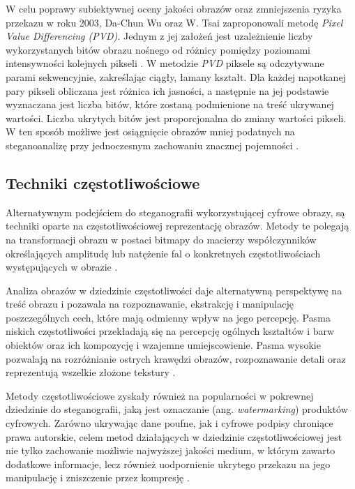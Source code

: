 {{{            %
            W celu poprawy subiektywnej oceny jakości obrazów oraz zmniejszenia ryzyka przekazu w roku 2003, Da-Chun Wu
            oraz  W. Tsai zaproponowali metodę \textit{Pixel Value Differencing \textnormal{(}PVD\textnormal{)}}. Jednym
            z jej założeń jest uzależnienie liczby wykorzystanych bitów obrazu nośnego od różnicy pomiędzy poziomami
            intensywności kolejnych  pikseli \cite{Wu2003ASM}. W metodzie \textit{PVD} piksele są odczytywane parami
            sekwencyjnie, zakreślając ciągły,  łamany kształt. Dla każdej napotkanej pary pikseli obliczana jest różnica
            ich jasności, a następnie na jej  podstawie wyznaczana jest liczba bitów, które zostaną podmienione na treść
            ukrywanej wartości. Liczba ukrytych  bitów jest proporcjonalna do zmiany wartości pikseli. W ten sposób
            możliwe jest osiągnięcie obrazów mniej  podatnych na steganoanalizę przy jednoczesnym zachowaniu znacznej
            pojemności \cite{Wu2003ASM}.

        }

        \subsection{Techniki częstotliwościowe}
        {
            Alternatywnym podejściem do steganografii wykorzystującej cyfrowe obrazy, są techniki oparte na
            częstotliwościowej reprezentację obrazów. Metody te polegają na transformacji obrazu w postaci bitmapy do
            macierzy współczynników określających amplitudę lub natężenie fal o konkretnych częstotliwościach
            występujących w obrazie \cite{ImageCompressionDCT, Reichel2001IntegerWT}.

            Analiza obrazów w dziedzinie częstotliwości daje alternatywną perspektywę na treść obrazu i pozawala na
            rozpoznawanie, ekstrakcję i manipulację poszczególnych cech, które mają odmienny wpływ na jego percepcję.
            Pasma niskich częstotliwości przekładają się na percepcję ogólnych kształtów i barw obiektów oraz ich
            kompozycję i wzajemne umiejscowienie. Pasma wysokie pozwalają na rozróżnianie ostrych krawędzi obrazów,
            rozpoznawanie detali oraz reprezentują wszelkie złożone tekstury \cite{ImageSpatialFreq}.

            Metody częstotliwościowe zyskały również na popularności w pokrewnej dziedzinie do steganografii, jaką jest
            oznaczanie (ang. \textit{watermarking}) produktów cyfrowych. Zarówno ukrywając dane poufne, jak i cyfrowe
            podpisy chroniące prawa autorskie, celem metod działających w dziedzinie częstotliwościowej jest nie tylko
            zachowanie możliwie najwyższej jakości medium, w którym zawarto dodatkowe informacje, lecz również
            uodpornienie ukrytego przekazu na jego manipulację i zniszczenie przez kompresję \cite{Tao2014RobustIW}.

}}}
